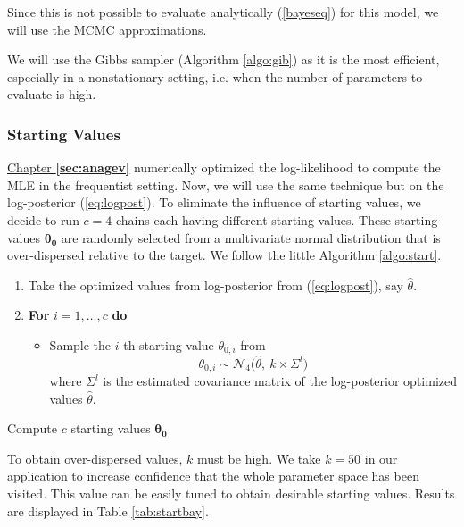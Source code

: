 Since this is not possible to evaluate analytically (\ref{bayeseq}) for this model, we will use the MCMC approximations. 

We will use the Gibbs sampler (Algorithm \ref{algo:gib}) as it is the most efficient, especially in a nonstationary setting, i.e. when the number of parameters to evaluate is high.



\subsubsection*{Starting Values}

\hyperref[sec:anagev]{Chapter \textbf{\ref{sec:anagev}}} numerically optimized the log-likelihood to compute the MLE in the frequentist setting. Now, we will use the same technique but on the log-posterior (\ref{eq:logpost}).
To eliminate the influence of starting values, we decide to run $c=4$ chains each having different starting values. These starting values $\boldsymbol{\theta_0}$ are randomly selected from a multivariate normal distribution that is over-dispersed relative to the target. We follow the little Algorithm \ref{algo:start}.

\vspace{.3cm}
\begin{algorithm}[H]
	\SetAlgoLined
	\begin{enumerate}
		\item Take the optimized values from log-posterior from (\ref{eq:logpost}), say $\hat{\theta}$.
		\item \textbf{For} $i=1,\ldots,c$ \quad \textbf{do}
		\begin{itemize}
			\item Sample the $i$-th starting value $\theta_{0,i}$ from
			\begin{equation*} 
      \theta_{0,i}\sim \mathcal{N}_4\Big(\hat{\theta}, \ k\times \Sigma^l\Big)
			\end{equation*}
			where $\Sigma^l$ is the estimated covariance matrix of the log-posterior optimized values $\hat{\theta}$.
		\end{itemize}
	\end{enumerate}
	\caption{Compute $c$ starting values $\boldsymbol{\theta_0}$}\label{algo:start}
\end{algorithm}
\vspace{.3cm}
To obtain over-dispersed values, $k$ must be high. We take $k=50$ in our application to increase confidence that the whole parameter space has been visited. This value can be easily tuned to obtain desirable starting values. Results are displayed in Table \ref{tab:startbay}.

